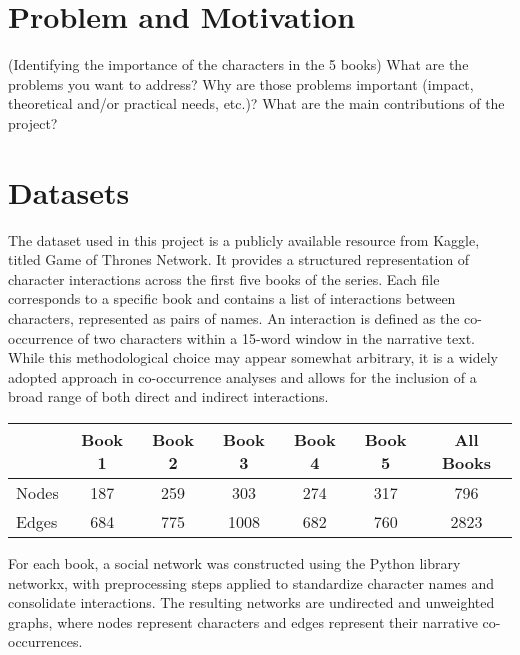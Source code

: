 \documentclass[12pt, a4paper]{article}
\begin{document}
\section{Problem and Motivation}
\label{problem-and-motivation}
(Identifying the importance of the characters in the 5 books)
What are the problems you want to address? Why are those problems
important (impact, theoretical and/or practical needs, etc.)? What are
the main contributions of the project?

\section{Datasets}
\label{datasets}
\begin{comment}
(Python Colab Notebook, GameOfThrones dataset public on kaggle)
How did you gather the data? Did you digitise it? How? Is the material
publicly available? What tools did you use 1) to handle (store,
manipulate) the data and 2) to compute measures on the data?
\end{comment}
The dataset used in this project is a publicly available resource from Kaggle, titled Game of Thrones Network. It provides a structured representation of character interactions across the first five books of the series. Each file corresponds to a specific book and contains a list of interactions between characters, represented as pairs of names. An interaction is defined as the co-occurrence of two characters within a 15-word window in the narrative text. While this methodological choice may appear somewhat arbitrary, it is a widely adopted approach in co-occurrence analyses and allows for the inclusion of a broad range of both direct and indirect interactions.

\begin{table}[ht] \centering
\begin{tabular}{lcccccc}
\hline
\textbf{} & \textbf{Book 1} & \textbf{Book 2} & \textbf{Book 3} & \textbf{Book 4} & \textbf{Book 5} & \textbf{All Books} \\
\hline
Nodes & 187 & 259 & 303 & 274 & 317 & 796 \\
Edges & 684 & 775 & 1008 & 682 & 760 & 2823 \\
\hline
\end{tabular}
\end{table}

For each book, a social network was constructed using the Python library networkx, with preprocessing steps applied to standardize character names and consolidate interactions. The resulting networks are undirected and unweighted graphs, where nodes represent characters and edges represent their narrative co-occurrences.
\end{document}
